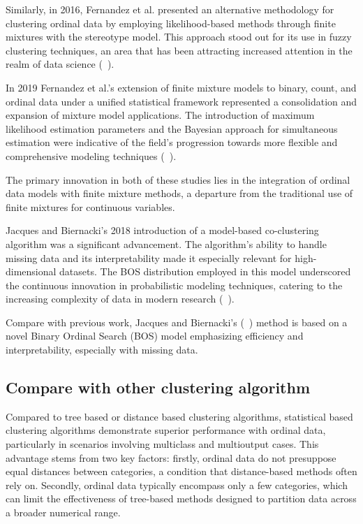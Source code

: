 \documentclass{article}
\begin{document}
Similarly, in 2016, Fernandez et al. presented an alternative methodology for clustering ordinal data by employing likelihood-based methods through finite mixtures with the stereotype model. This approach stood out for its use in fuzzy clustering techniques, an area that has been attracting increased attention in the realm of data science (~\cite{fernandez2016mixture}).

In 2019 Fernandez et al.'s extension of finite mixture models to binary, count, and ordinal data under a unified statistical framework represented a consolidation and expansion of mixture model applications. The introduction of maximum likelihood estimation parameters and the Bayesian approach for simultaneous estimation were indicative of the field's progression towards more flexible and comprehensive modeling techniques (~\cite{fernandez2019finite}).

The primary innovation in both of these studies lies in the integration of ordinal data models with finite mixture methods, a departure from the traditional use of finite mixtures for continuous variables.


Jacques and Biernacki's 2018 introduction of a model-based co-clustering algorithm was a significant advancement. The algorithm's ability to handle missing data and its interpretability made it especially relevant for high-dimensional datasets. The BOS distribution employed in this model underscored the continuous innovation in probabilistic modeling techniques, catering to the increasing complexity of data in modern research (~\cite{jacques2018model}).

Compare with previous work, Jacques and Biernacki's (~\cite{jacques2018model}) method is based on a novel Binary Ordinal Search (BOS) model emphasizing efficiency and interpretability, especially with missing data. 

\subsection*{Compare with other clustering algorithm}

Compared to tree based or distance based clustering algorithms, statistical based clustering algorithms demonstrate superior performance with ordinal data, particularly in scenarios involving multiclass and multioutput cases. 
This advantage stems from two key factors: firstly, ordinal data do not presuppose equal distances between categories, a condition that distance-based methods often rely on. Secondly, ordinal data typically encompass only a few categories, which can limit the effectiveness of tree-based methods designed to partition data across a broader numerical range.
\end{document}
